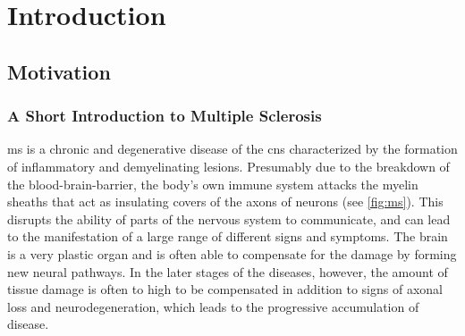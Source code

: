 \chapter{Introduction}


\section{Motivation}

\subsection[A short introduction to multiple sclerosis]{A Short Introduction to
Multiple Sclerosis}

\Gls{ms} is a chronic and degenerative disease of the \gls{cns} characterized by
the formation of inflammatory and demyelinating lesions. Presumably due to the
breakdown of the blood-brain-barrier, the body's own immune system attacks the
myelin sheaths that act as insulating covers of the axons of neurons (see
\ref{fig:ms}). This disrupts the ability of parts of the nervous system to
communicate, and can lead to the manifestation of a large range of different
signs and symptoms. The brain is a very plastic organ and is often able to
compensate for the damage by forming new neural pathways. In the later stages of
the diseases, however, the amount of tissue damage is often to high to be
compensated in addition to signs of axonal loss and neurodegeneration, which
leads to the progressive accumulation of disease.

